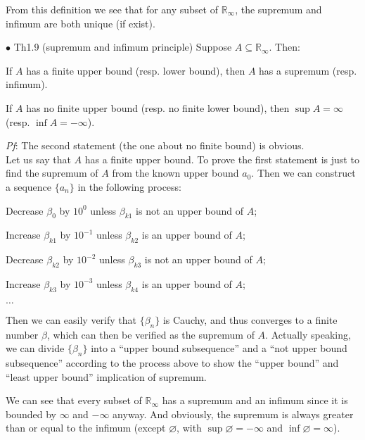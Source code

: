 \documentclass{article}
\begin{document}
\begin{Rmk}{}
    From this definition we see that \textcolor{Th}{for any subset of $\mathbb{R}_\infty$, the supremum and infimum are both unique (if exist).}
\end{Rmk}

\begin{Th}{$\bullet$ Th1.9 (supremum and infimum principle)}
    Suppose $A\subseteq\mathbb{R}_{\infty}$. Then:
    \begin{compactenum}
        \item If $A$ has a finite upper bound (resp. lower bound), then $A$ has a supremum (resp. infimum).
        \item If $A$ has no finite upper bound (resp. no finite lower bound), then $\sup A=\infty$ (resp. $\inf A=-\infty$).
    \end{compactenum}
    \tcblower
    \textit{Pf}: The second statement (the one about no finite bound) is obvious.\\
    Let us say that $A$ has a finite upper bound. To prove the first statement is just to find the supremum of $A$ from the known upper bound $a_0$. Then we can construct a sequence $\{a_n\}$ in the following process:
        \begin{compactenum}
            \item Decrease $\beta_0$ by $10^0$ unless $\beta_{k1}$ is not an upper bound of $A$;
            \item Increase $\beta_{k1}$ by $10^{-1}$ unless $\beta_{k2}$ is an upper bound of $A$;
            \item Decrease $\beta_{k2}$ by $10^{-2}$ unless $\beta_{k3}$ is not an upper bound of $A$;
            \item Increase $\beta_{k3}$ by $10^{-3}$ unless $\beta_{k4}$ is an upper bound of $A$;
            \item $\dots$
        \end{compactenum}
    Then we can easily verify that $\{\beta_n\}$ is Cauchy, and thus converges to a finite number $\beta$, which can then be verified as the supremum of $A$. Actually speaking, we can divide $\{\beta_n\}$ into a ``upper bound subsequence'' and a ``not upper bound subsequence'' according to the process above to show the ``upper bound'' and ``least upper bound'' implication of supremum.
\end{Th}

\begin{Rmk}{}
    We can see that \textcolor{Th}{every subset of $\mathbb{R}_\infty$ has a supremum and an infimum} since it is bounded by $\infty$ and $-\infty$ anyway. And obviously, \textcolor{Th}{the supremum is always greater than or equal to the infimum (except $\varnothing$, with $\sup\varnothing = -\infty$ and $\inf\varnothing = \infty$).}
\end{Rmk}
\end{document}
